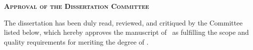 \documentclass[11pt]{Thesis} %
\begin{document}
\pagestyle{empty} 
\begin{center}

    \setlength{\parskip}{0pt}
{\Large \textbf{\textsc{  Approval of the Dissertation Committee}}}\par
   \vskip 0.3cm
       \end{center}
      {\normalsize The dissertation has been duly read, reviewed, and critiqued by the Committee listed below, which hereby approves the manuscript of \authornames~as fulfilling the scope and quality requirements for meriting the degree of \degreename. \par}  %
      \vskip 1.5cm
\end{document}

